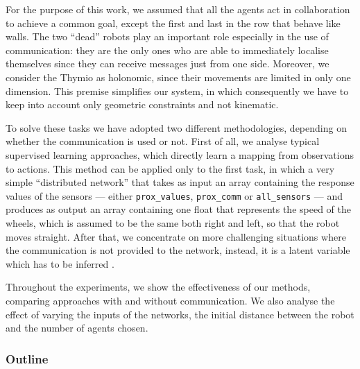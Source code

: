 For the purpose of this work, we assumed that all the agents act in collaboration 
to achieve a common goal, except the first and last in the row that behave like 
walls. The two ``dead'' robots play an important role especially in the use of 
communication: they are the only ones who are able to immediately localise 
themselves since they can receive messages just from one side.
Moreover, we consider the Thymio as holonomic, since their movements are 
limited in only one dimension. This premise simplifies our system, in which 
consequently we have to keep into account only geometric constraints and not
kinematic.

To solve these tasks we have adopted two different methodologies, depending on 
whether the communication is used or not.
First of all, we analyse typical supervised learning approaches, which directly learn 
a mapping from observations to actions. This method can be applied only to the 
first task, in which a very simple ``distributed network'' that takes as input an 
array containing the response values of the sensors — either 
\texttt{prox\_values},  \texttt{prox\_comm} or  \texttt{all\_sensors} — and 
produces as output an array containing one float that represents the speed of the 
wheels, which is assumed to be the same both right and left, so that the robot 
moves straight.
After that, we concentrate on more challenging situations where the 
communication is not provided to the network, instead, it is a latent variable 
which has to be inferred \cite[][]{le2017coordinated}.

Throughout the experiments, we show the effectiveness of our methods, 
comparing approaches with and without communication. We also analyse the 
effect of varying the inputs of the networks, the initial distance between the robot  
and the number of agents chosen.

\bigskip
\subsubsection*{Outline}
\label{subsec:outline}

